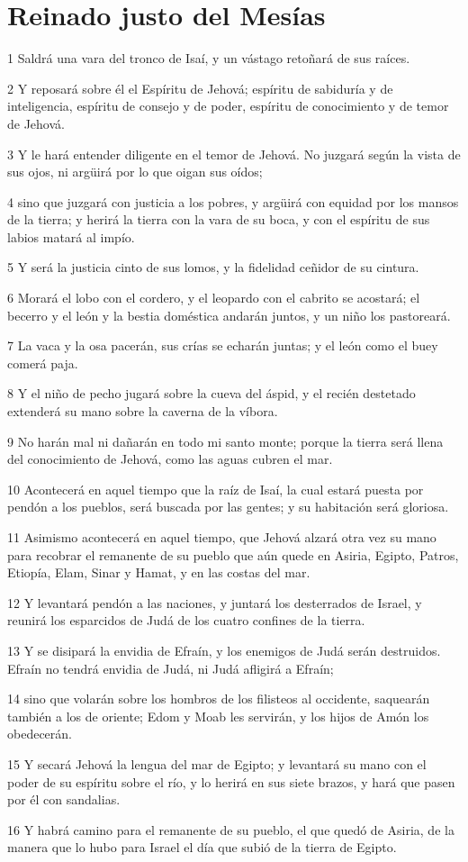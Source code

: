 \section*{Reinado justo del Mesías}

\par 1 Saldrá una vara del tronco de Isaí, y un vástago retoñará de sus raíces. 
\par 2 Y reposará sobre él el Espíritu de Jehová; espíritu de sabiduría y de inteligencia, espíritu de consejo y de poder, espíritu de conocimiento y de temor de Jehová.
\par 3 Y le hará entender diligente en el temor de Jehová. No juzgará según la vista de sus ojos, ni argüirá por lo que oigan sus oídos;
\par 4 sino que juzgará con justicia a los pobres, y argüirá con equidad por los mansos de la tierra; y herirá la tierra con la vara de su boca, y con el espíritu de sus labios matará al impío. 
\par 5 Y será la justicia cinto de sus lomos, y la fidelidad ceñidor de su cintura.
\par 6 Morará el lobo con el cordero, y el leopardo con el cabrito se acostará; el becerro y el león y la bestia doméstica andarán juntos, y un niño los pastoreará.
\par 7 La vaca y la osa pacerán, sus crías se echarán juntas; y el león como el buey comerá paja.
\par 8 Y el niño de pecho jugará sobre la cueva del áspid, y el recién destetado extenderá su mano sobre la caverna de la víbora.
\par 9 No harán mal ni dañarán en todo mi santo monte; porque la tierra será llena del conocimiento de Jehová, como las aguas cubren el mar. 
\par 10 Acontecerá en aquel tiempo que la raíz de Isaí, la cual estará puesta por pendón a los pueblos, será buscada por las gentes; y su habitación será gloriosa.
\par 11 Asimismo acontecerá en aquel tiempo, que Jehová alzará otra vez su mano para recobrar el remanente de su pueblo que aún quede en Asiria, Egipto, Patros, Etiopía, Elam, Sinar y Hamat, y en las costas del mar.
\par 12 Y levantará pendón a las naciones, y juntará los desterrados de Israel, y reunirá los esparcidos de Judá de los cuatro confines de la tierra.
\par 13 Y se disipará la envidia de Efraín, y los enemigos de Judá serán destruidos. Efraín no tendrá envidia de Judá, ni Judá afligirá a Efraín;
\par 14 sino que volarán sobre los hombros de los filisteos al occidente, saquearán también a los de oriente; Edom y Moab les servirán, y los hijos de Amón los obedecerán.
\par 15 Y secará Jehová la lengua del mar de Egipto; y levantará su mano con el poder de su espíritu sobre el río, y lo herirá en sus siete brazos, y hará que pasen por él con sandalias. 
\par 16 Y habrá camino para el remanente de su pueblo, el que quedó de Asiria, de la manera que lo hubo para Israel el día que subió de la tierra de Egipto.


